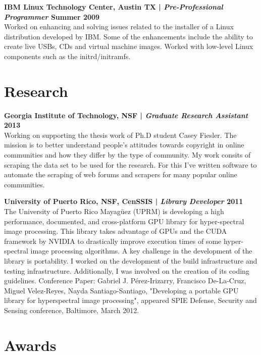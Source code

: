 \documentclass[margin,line]{res}
\begin{document}
\begin{resume}
{\bf IBM Linux Technology Center, Austin TX | {\em Pre-Professional Programmer} \hfill {\bf Summer 2009 \\} }
\vspace{-.01cm}
Worked on enhancing and solving issues related to the installer of a Linux distribution developed by IBM. Some of the enhancements include the ability to create live USBs, CDs and virtual machine images. Worked with low-level Linux components such as the initrd/initramfs.

\section{\sc Research}

{\bf Georgia Institute of Technology, NSF | {\em Graduate Research Assistant} \hfill {\bf 2013 \\} }
\vspace{-.01cm}
Working on supporting the thesis work of Ph.D student Casey Fiesler. The mission is to better understand people's attitudes towards copyright in online communities and how they differ by the type of community. My work consits of scraping the data set to be used for the research. For this I've written software to automate the scraping of web forums and scrapers for many popular online communities.

\clearpage

{\bf University of Puerto Rico, NSF, CenSSIS  | {\em Library Developer} \hfill {\bf 2011 \\} }
\vspace{-.01cm}
The University of Puerto Rico Mayagüez (UPRM) is developing a high performance, documented, and cross-platform GPU library for hyper-spectral image processing. This library takes advantage of GPUs and the CUDA framework by NVIDIA to drastically improve execution times of some hyper-spectral image processing algorithms. A key challenge in the development of the library is portability. I worked on the development of the build infrastructure and testing infrastructure. Additionally, I was involved on the creation of its coding guidelines. Conference Paper: Gabriel J. Pérez-Irizarry, Francisco De-La-Cruz, Miguel Velez-Reyes, Nayda Santiago-Santiago, "Developing a portable GPU library for hyperspectral image processing", appeared SPIE Defense, Security and Sensing conference, Baltimore, March 2012.

\section{\sc Awards}


\end{resume}
\end{document}
